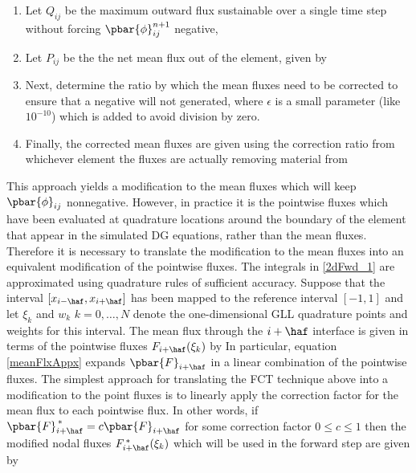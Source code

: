 \documentclass{ametsoc}
\begin{document}
\begin{enumerate}
\item Let $Q_{ij}$ be the maximum outward flux sustainable over a single time step without forcing $\pbar{\phi}_{ij}^{n+1}$ negative,
\item Let $P_{ij}$ be the the net mean flux out of the element, given by
\item Next, determine the ratio by which the mean fluxes need to be corrected to ensure that a negative will not generated,
where $\epsilon$ is a small parameter (like $10^{-10}$) which is added to avoid division by zero.
\item Finally, the corrected mean fluxes are given using the correction ratio from whichever element the fluxes are actually removing material from
\end{enumerate}

This approach yields a modification to the mean fluxes which will keep $\pbar{\phi}_{ij}$ nonnegative. However, in practice it is the pointwise fluxes which have been evaluated at quadrature locations around the boundary of the element that appear in the simulated  DG equations, rather than the mean fluxes. Therefore it is necessary to translate the modification to the mean fluxes into an equivalent modification of the pointwise fluxes. The integrals in \eqref{2dFwd_1} are approximated using quadrature rules of sufficient accuracy. Suppose that the interval $[x_{i-\haf} , x_{i+\haf}]$ has been mapped to the reference interval $[-1,1]$ and let $\xi_k$ and $w_k$ $k=0,\dots,N$ denote the one-dimensional GLL quadrature points and weights for this interval. The mean flux through the $i+\haf$ interface is given in terms of the pointwise fluxes $F_{i+\haf}(\xi_k)$ by
In particular, equation \eqref{meanFlxAppx} expands $\pbar{F}_{i+\haf}$ in a linear combination of the pointwise fluxes. The simplest approach for translating the FCT technique above into a modification to the point fluxes is to linearly apply the correction factor for the mean flux to each pointwise flux. In other words, if $\pbar{F}_{i+\haf}^{\,*} = c \pbar{F}_{i+\haf}$ for some correction factor $0\leq c \leq1$ then the modified nodal fluxes $F_{i+\haf}^{\,*}(\xi_k)$ which will be used in the forward step are given by
\end{document}
